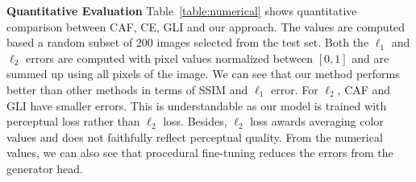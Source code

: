 \noindent\textbf{Quantitative Evaluation} Table~\ref{table:numerical} shows quantitative comparison between CAF, CE, GLI and our approach. The values are computed based a random subset of 200 images selected from the test set. Both the $\ell_1$ and $\ell_2$ errors are computed with pixel values normalized between $[0,1]$ and are summed up using all pixels of the image. We can see that our method performs better than other methods in terms of SSIM and $\ell_1$ error. For $\ell_2$, CAF and GLI have smaller errors. This is understandable as our model is trained with perceptual loss rather than $\ell_2$ loss. Besides, $\ell_2$ loss awards averaging color values and does not faithfully reflect perceptual quality. From the numerical values, we can also see that procedural fine-tuning reduces the errors from the generator head. 

\begin{table}[h!]
\begin{center}
  \end{center}
  \caption{Numerical comparison between CAF, CE and GLI, our generator head results and our final results. Up/down are results of center/random region completion. Note that for SSIM, larger values mean greater similarity in terms of content structure and are indicators of better performance.}
  \vspace{-20pt}
  \label{table:numerical}
\end{table}

